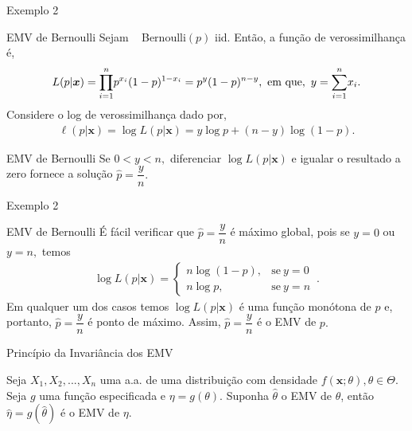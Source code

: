 \documentclass[12pt]{beamer}
\begin{document}
\begin{frame}{Exemplo 2}
\begin{block}{EMV de Bernoulli}
\justifying
Sejam \seqX~ Bernoulli$(p)$ iid. Então, a função de verossimilhança é,
\begin{align*}
    L(p|\boldsymbol{x})={\displaystyle \prod_{i=1}^{n}} p^{x_{i}}(1-p)^{1-x_{i}}=p^{y}(1-p)^{n-y},~\text{em que},~y={\displaystyle \sum_{i=1}^{n}} x_{i}.
\end{align*}
Considere o log de verossimilhança dado por,
\begin{align*}
    \ell(p|\boldsymbol{x})=\log{L(p|\boldsymbol{x})}=y\log{p}+(n-y)\log{(1-p)}.
\end{align*}
\end{block}
\pause
\begin{block}{EMV de Bernoulli}
\justifying
Se $0<y<n,$ diferenciar $\log{L(p|\boldsymbol{x})}$ e igualar o resultado a zero fornece a solução $\hat{p}=\dfrac{y}{n}.$ 
\end{block}
\end{frame}

\begin{frame}{Exemplo 2}
\begin{block}{EMV de Bernoulli}
\justifying
É fácil verificar que $\hat{p}=\dfrac{y}{n}$ é máximo global, pois se $y=0$ ou $y=n,$ temos
\begin{align*}
\log{L(p|\boldsymbol{x})}=
\begin{cases}
      n\log{(1-p)},&\text{se}~y=0\\
      n\log{p},&\text{se}~y=n
    \end{cases}\,.
\end{align*}
Em qualquer um dos casos temos $\log{L(p|\boldsymbol{x})}$ é uma função monótona de $p$ e, portanto, $\hat{p}=\dfrac{y}{n}$ é ponto de máximo. Assim, $\hat{p}=\dfrac{y}{n}$ é o EMV de $p.$
\end{block}
\end{frame}

\begin{frame}{Princípio da Invariância dos EMV}
\begin{Teorema}\label{Teo2}
\justifying
Seja $X_1, X_2, ..., X_n$ uma a.a. de uma distribuição com densidade $f(\boldsymbol{x};\theta), \theta \in \Theta.$ Seja $g$ uma função especificada e $\eta=g(\theta).$ Suponha $\hat{\theta}$ o EMV de $\theta$, então $\hat{\eta}=g(\hat{\theta})$ é o EMV de $\eta.$
\end{Teorema}
\end{frame}
\end{document}
